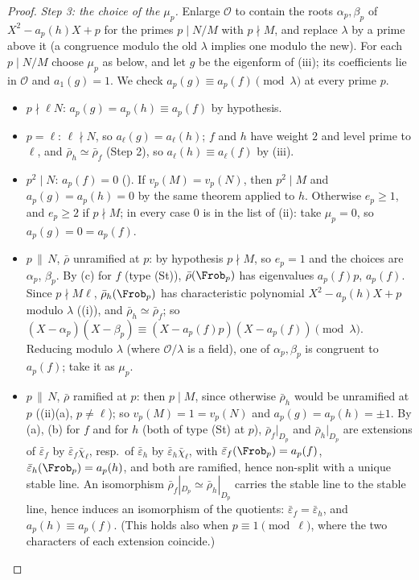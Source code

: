 \begin{proof}
\emph{Step 3: the choice of the $\mu_p$.} Enlarge $\mathcal{O}$ to contain the roots $\alpha_p,\beta_p$ of $X^2-a_p(h)X+p$ for the primes $p\mid N/M$ with $p\nmid M$, and replace $\lambda$ by a
prime above it (a congruence modulo the old $\lambda$ implies one modulo the new). For each $p\mid N/M$ choose $\mu_p$ as below, and let $g$ be the eigenform of
(iii); its coefficients lie in $\mathcal{O}$ and $a_1(g)=1$. We check $a_p(g)\equiv a_p(f)\pmod\lambda$ at every prime $p$.
\begin{itemize}
\item $p\nmid\ell N$: $a_p(g)=a_p(h)\equiv a_p(f)$ by hypothesis.
\item $p=\ell$: $\ell\nmid N$, so $a_\ell(g)=a_\ell(h)$; $f$ and $h$ have weight $2$ and level prime to $\ell$, and $\bar\rho_h\simeq\bar\rho_f$ (Step 2), so $a_\ell(h)\equiv a_\ell(f)$ by
(iii).
\item $p^2\mid N$: $a_p(f)=0$ (). If $v_p(M)=v_p(N)$, then $p^2\mid M$ and $a_p(g)=a_p(h)=0$ by the same theorem applied to $h$. Otherwise $e_p\ge1$, and
$e_p\ge2$ if $p\nmid M$; in every case $0$ is in the list of (ii): take $\mu_p=0$, so $a_p(g)=0=a_p(f)$.
\item $p\,\|\,N$, $\bar\rho$ unramified at $p$: by hypothesis $p\nmid M$, so $e_p=1$ and the choices are $\alpha_p$, $\beta_p$. By (c) for $f$ (type (St)),
$\bar\rho(\Frob_p)$ has eigenvalues $a_p(f)p$, $a_p(f)$. Since $p\nmid M\ell$, $\bar\rho_h(\Frob_p)$ has characteristic polynomial $X^2-a_p(h)X+p$ modulo $\lambda$
((i)), and $\bar\rho_h\simeq\bar\rho_f$; so $(X-\alpha_p)(X-\beta_p)\equiv(X-a_p(f)p)(X-a_p(f))\pmod\lambda$. Reducing modulo $\lambda$ (where $\mathcal{O}/\lambda$ is a field),
one of $\alpha_p,\beta_p$ is congruent to $a_p(f)$; take it as $\mu_p$.
\item $p\,\|\,N$, $\bar\rho$ ramified at $p$: then $p\mid M$, since otherwise $\bar\rho_h$ would be unramified at $p$ ((ii)(a), $p\ne\ell$); so
$v_p(M)=1=v_p(N)$ and $a_p(g)=a_p(h)=\pm1$. By (a), (b) for $f$ and for $h$ (both of type (St) at $p$), $\bar\rho_f|_{D_p}$ and $\bar\rho_h|_{D_p}$
are extensions of $\bar\varepsilon_f$ by $\bar\varepsilon_f\bar\chi_\ell$, resp.\ of $\bar\varepsilon_h$ by $\bar\varepsilon_h\bar\chi_\ell$, with $\bar\varepsilon_f(\Frob_p)=a_p(f)$, $\bar\varepsilon_h(\Frob_p)=a_p(h)$, and both are ramified,
hence non-split with a unique stable line. An isomorphism $\bar\rho_f|_{D_p}\simeq\bar\rho_h|_{D_p}$ carries the stable line to the stable line, hence induces an isomorphism of
the quotients: $\bar\varepsilon_f=\bar\varepsilon_h$, and $a_p(h)\equiv a_p(f)$. (This holds also when $p\equiv1\pmod\ell$, where the two characters of each extension coincide.)
\end{itemize}


\end{proof}
